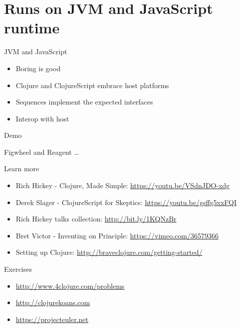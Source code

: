 \documentclass[presentation]{beamer}
\begin{document}
\section{Runs on JVM and JavaScript runtime}
\label{sec:orgheadline21}

\begin{frame}[label={sec:orgheadline17}]{JVM and JavaScript}
\begin{itemize}
\item Boring is good
\item Clojure and ClojureScript embrace host platforms
\item Sequences implement the expected interfaces
\item Interop with host
\end{itemize}
\end{frame}

\begin{frame}[label={sec:orgheadline18}]{Demo}
\begin{alertblock}{Figwheel and Reagent}
\ldots{}
\end{alertblock}
\end{frame}

\begin{frame}[label={sec:orgheadline19}]{Learn more}
\begin{itemize}
\item Rich Hickey - Clojure, Made Simple: \url{https://youtu.be/VSdnJDO-xdg}
\item Derek Slager - ClojureScript for Skeptics: \url{https://youtu.be/gsffg5xxFQI}
\item Rich Hickey talks collection: \url{http://bit.ly/1KQNzBr}
\item Bret Victor - Inventing on Principle: \url{https://vimeo.com/36579366}
\item Setting up Clojure: \url{http://braveclojure.com/getting-started/}
\end{itemize}
\end{frame}

\begin{frame}[label={sec:orgheadline20}]{Exercises}
\begin{itemize}
\item \url{http://www.4clojure.com/problems}
\item \url{http://clojurekoans.com}
\item \url{https://projecteuler.net}
\end{itemize}
\end{frame}
\end{document}
